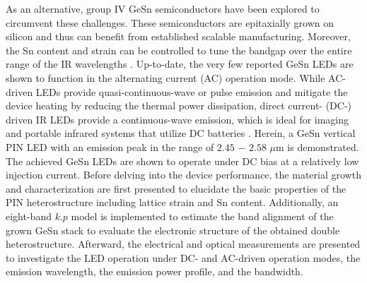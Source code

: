  As an alternative, group IV GeSn semiconductors have been explored to circumvent these challenges. These semiconductors are epitaxially grown on silicon and thus can benefit from established scalable manufacturing. Moreover, the Sn content and strain can be controlled to tune the bandgap over the entire range of the IR wavelengths \cite{atalla2023extended,Moutanabbir2021,VondenDriesch2015,Buca2022,wu2023ge}. Up-to-date, the very few reported GeSn LEDs are shown to function in the alternating current (AC) operation mode\cite{Huang2019,Peng2020,Stange2017,bertrand2019mid,Gallagher2015}. While AC-driven LEDs provide quasi-continuous-wave or pulse emission and mitigate the device heating by reducing the thermal power dissipation, direct current- (DC-) driven IR LEDs provide a continuous-wave emission, which is ideal for imaging and portable infrared systems that utilize DC batteries  \cite{thirumalai2018light,lasance2014thermal}. Herein, a GeSn vertical PIN LED with an emission peak in the range of $2.45$ $-$ $2.58$ $\mu$m is demonstrated. The achieved GeSn LEDs are shown to operate under DC bias at a relatively low injection current. Before delving into the device performance, the material growth and characterization are first presented to elucidate the basic properties of the PIN heterostructure including lattice strain and Sn content. Additionally, an eight-band $k.p$ model is implemented to estimate the band alignment of the grown GeSn stack to evaluate the electronic structure of the obtained double heterostructure. Afterward, the electrical and optical measurements are presented to investigate the LED operation under DC- and AC-driven operation modes, the emission wavelength, the emission power profile, and the bandwidth. 



\bigskip

